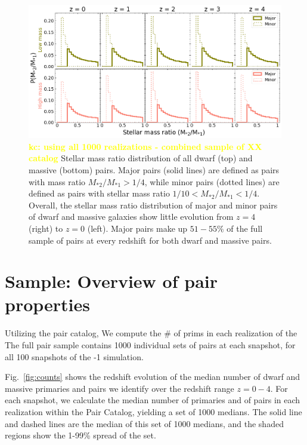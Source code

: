 \documentclass[twocolumn]{aastex631}
\newcommand{\kc}[1]{\textcolor{yellow}{\textbf{kc: #1}} }
\newcommand{\ms}[1]{\ensuremath{M_{*{#1}}}}
\begin{document}
\begin{figure}[htb]
    \centering
    \includegraphics[width=\textwidth]{smrdist_1000.png}
    \caption{\kc{using all 1000 realizations - combined sample of XX catalog} Stellar mass ratio distribution of all dwarf (top) and massive (bottom) pairs. Major pairs (solid lines) are defined as pairs with mass ratio $\ms{2}/\ms{1} > 1/4$, while minor pairs (dotted lines) are defined as pairs with stellar mass ratio $1/10<\ms{2}/\ms{1}<1/4$. Overall, the stellar mass ratio distribution of major and minor pairs of dwarf and massive galaxies show little evolution from $z=4$ (right) to $z=0$ (left). 
    Major pairs make up $51-55\%$ of the full sample of pairs at every redshift for both dwarf and massive pairs.}
    \label{fig:massratio}
\end{figure}

\section{Sample: Overview of pair properties} \label{sec:pairprops}
    Utilizing the pair catalog, We compute the # of prims in each realization of the 
    The full pair sample contains 1000 individual sets of pairs at each snapshot, for all 100 snapshots of the -1 simulation. 
   


    Fig.~\ref{fig:counts} shows the redshift evolution of the median number of dwarf and massive primaries and pairs we identify over the redshift range $z=0-4$.   
    For each snapshot, we calculate the median number of primaries and of pairs in each realization within the Pair Catalog, yielding a set of 1000 medians. 
    The solid line and dashed lines are the median of this set of 1000 medians, and the shaded regions show the 1-99\% spread of the set.
    
\end{document}

